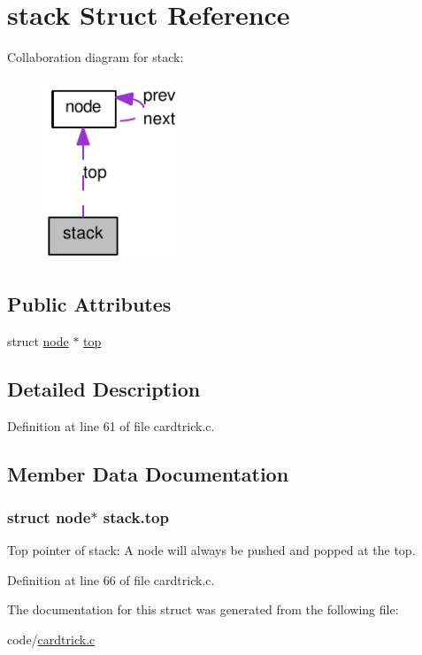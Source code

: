 \hypertarget{structstack}{
\section{stack Struct Reference}
\label{structstack}
}


Collaboration diagram for stack:\nopagebreak
\begin{figure}[H]
\begin{center}
\leavevmode
\includegraphics[width=119pt]{structstack__coll__graph}
\end{center}
\end{figure}
\subsection*{Public Attributes}
\begin{DoxyCompactItemize}
\item 
struct \hyperlink{structnode}{node} $\ast$ \hyperlink{structstack_ab1713a4aa13c94c6676f0ed3f33478dc}{top}
\end{DoxyCompactItemize}


\subsection{Detailed Description}


Definition at line 61 of file cardtrick.c.



\subsection{Member Data Documentation}
\hypertarget{structstack_ab1713a4aa13c94c6676f0ed3f33478dc}{
\subsubsection[{top}]{\setlength{\rightskip}{0pt plus 5cm}struct {\bf node}$\ast$ {\bf stack.top}}}
\label{structstack_ab1713a4aa13c94c6676f0ed3f33478dc}
Top pointer of stack: A node will always be pushed and popped at the top. 

Definition at line 66 of file cardtrick.c.



The documentation for this struct was generated from the following file:\begin{DoxyCompactItemize}
\item 
code/\hyperlink{cardtrick_8c}{cardtrick.c}\end{DoxyCompactItemize}

